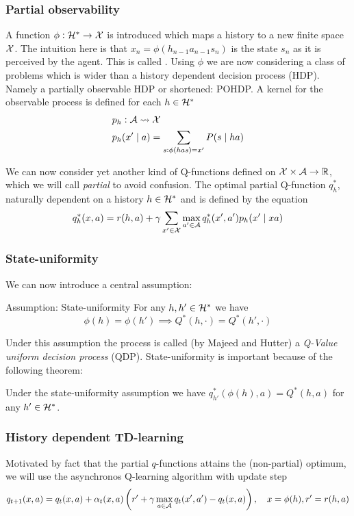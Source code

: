 \documentclass{beamer}[10]
\begin{document}
\begin{frame}
  \frametitle{Partial observability}
  A function $\phi : \mathcal{H}^* \to \mathcal{X}$ is introduced
  which maps a history to a new finite space $\mathcal{X}$.
  The intuition here is that $x_n = \phi(h_{n-1} a_{n-1} s_n)$ is the
  state $s_n$ as it is perceived by the agent.
  This is called .
  Using $\phi$ we are now considering a class of problems
  which is wider than a 
  history dependent decision process (HDP).
  Namely a partially observable HDP or shortened: POHDP.
  A kernel for the observable process is defined for each $h \in \mathcal{H}^*$
  \begin{align*} p_h & : \mathcal{A} \leadsto \mathcal{X}
    \\ p_h & (x' \mid a)
    = \sum_{s:\phi(has)=x'} P(s \mid ha)
  \end{align*}
\end{frame}

\begin{frame}
  We can now consider yet another kind of Q-functions defined
  on $\mathcal{X} \times \mathcal{A} \to \mathbb{R}$, which we will call \emph{partial} to avoid
  confusion. The optimal partial Q-function $q_h^*$,
  naturally dependent on a history $h \in \mathcal{H}^*$ and is defined by the equation
  \begin{equation}
    q_h^*(x, a) = r(h,a) + \gamma \sum_{x' \in \mathcal{X}} 
    \max_{a' \in \mathcal{A}} q^*_h(x', a') p_h(x' \mid xa)
  \end{equation}
\end{frame}

\begin{frame}
  \frametitle{State-uniformity}
  We can now introduce a central assumption:
  \begin{block}{Assumption: State-uniformity}
    For any $h,h' \in \mathcal{H}^*$ we have
    \[ \phi(h) = \phi(h') \implies Q^*(h, \cdot) = Q^*(h', \cdot) \]
  \end{block}
  Under this assumption the process is called (by Majeed and Hutter)
  a \emph{Q-Value uniform decision process} (QDP).
  State-uniformity is important because of the following theorem:
  \begin{thm}[Hutter, 2016]
    Under the state-uniformity assumption we have
    $q^*_{h'}(\phi(h), a) = Q^*(h, a)$ for any $h'\in \mathcal{H}^*$.
  \end{thm}
\end{frame}

\begin{frame}
  \frametitle{History dependent TD-learning}
  Motivated by fact that the partial $q$-functions attains
  the (non-partial) optimum, we will use the asynchronos 
  Q-learning algorithm with update step
  \[ q_{t+1}(x, a) = q_t(x, a) + \alpha_t(x, a)
    \left(r' + \gamma \max_{a \in \mathcal{A}} q_t(x', a') - q_t(x, a)\right),
  \quad x = \phi(h), r' = r(h,a) \]
\end{frame}
\end{document}
